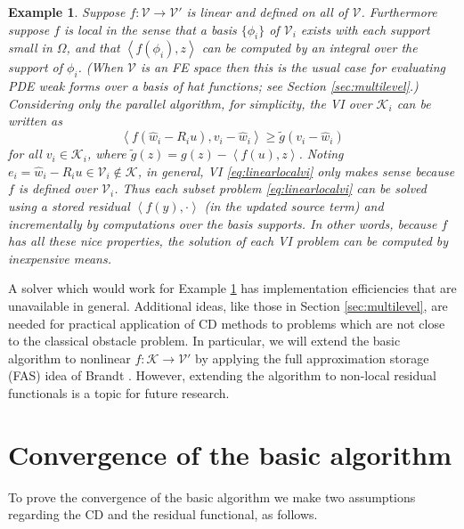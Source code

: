\documentclass[letterpaper,final,12pt,reqno]{amsart}
\theoremstyle{cstyle}
\theoremstyle{dstyle}
\newtheorem{example}[theorem]{Example}
\numberwithin{equation}{section}
\numberwithin{figure}{section}
\numberwithin{table}{section}
\numberwithin{theorem}{section}
\newcommand{\cK}{\mathcal{K}}
\newcommand{\cV}{\mathcal{V}}
\newcommand{\ip}[2]{\left<#1,#2\right>}
\begin{document}
\begin{example}  \label{ex:fnice} Suppose $f:\cV \to \cV'$ is linear and defined on all of $\cV$.  Furthermore suppose $f$ is local in the sense that a basis $\{\phi_i\}$ of $\cV_i$ exists with each support small in $\Omega$, and that $\ip{f(\phi_i)}{z}$ can be computed by an integral over the support of $\phi_i$.  (When $\cV$ is an FE space then this is the usual case for evaluating PDE weak forms over a basis of hat functions; see Section \ref{sec:multilevel}.)  Considering only the parallel algorithm, for simplicity, the VI over $\cK_i$ can be written as
\begin{equation}
\ip{f(\hat w_i - R_i u)}{v_i-\hat w_i} \ge \tilde g(v_i-\hat w_i) \label{eq:linearlocalvi}
\end{equation}
for all $v_i\in \cK_i$, where $\tilde g(z) = g(z) - \ip{f(u)}{z}$.  Noting $e_i = \hat w_i - R_i u \in \cV_i \notin \cK$, in general, VI \eqref{eq:linearlocalvi} only makes sense because $f$ is defined over $\cV_i$.  Thus each subset problem \eqref{eq:linearlocalvi} can be solved using a stored residual $\ip{f(y)}{\cdot}$ (in the updated source term) and incrementally by computations over the basis supports.  In other words, because $f$ has all these nice properties, the solution of each VI problem can be computed by inexpensive means.
\end{example}

A solver which would work for Example \ref{ex:fnice} has implementation efficiencies that are unavailable in general.  Additional ideas, like those in Section \ref{sec:multilevel}, are needed for practical application of CD methods to problems which are not close to the classical obstacle problem.  In particular, we will extend the basic algorithm to nonlinear $f:\cK\to \cV'$ by applying the full approximation storage (FAS) idea of Brandt \cite{Brandt1977}.  However, extending the algorithm to non-local residual functionals is a topic for future research.


\section{Convergence of the basic algorithm} \label{sec:convergence}

To prove the convergence of the basic algorithm we make two assumptions regarding the CD and the residual functional, as follows.
\end{document}
